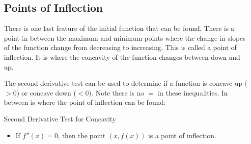 \subsection*{Points of Inflection}\label{sec:PointsOfInflection}
\begin{multicols}{2}
There is one last feature of the initial function that can be found. There is a point in between the maximum and minimum points where the change in slopes of the function change from decreasing to increasing. This is called a point of inflection. It is where the concavity of the function changes between down and up.\columnbreak
\begin{center}
\end{center}
\end{multicols}

The second derivative test can be used to determine if a function is concave-up ($>0$) or concave down ($<0$). Note there is no $=$ in these inequalities. In between is where the point of inflection can be found:
\begin{tcolorbox}
	Second Derivative Test for Concavity
	\begin{itemize}
		\item If $f''(x)=0$, then the point $(x,f(x))$ is a point of inflection.\\                         
	\end{itemize}
\end{tcolorbox}

